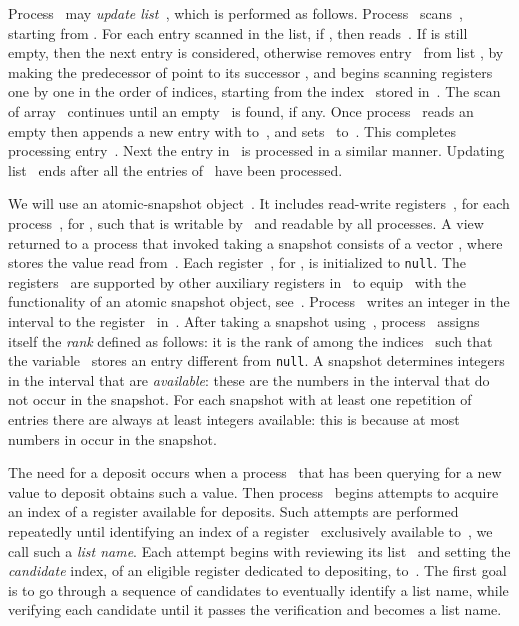 \documentclass[11pt]{article}
\begin{document}
Process~ may \emph{update list~}, which is performed as follows.
Process~ scans~, starting from .
For each entry  scanned in the list, if , then  reads~. 
If  is still empty, then the next entry  is considered, otherwise  removes entry~ from  list , by making the predecessor of  point to its successor , and begins scanning registers~ one by one in the order of indices, starting from the index~ stored in~.
The scan of array~ continues until an empty~ is found, if any.
Once process~ reads an empty  then  appends a new entry  with   to~, and sets~ to~.
This completes processing entry~.
Next the entry  in~ is processed in a similar manner.
Updating list~ ends after all the entries of~ have been processed.

We will use an atomic-snapshot object~. 
It includes read-write registers~, for each process~, for , such that  is writable by~ and readable by all processes.
A view returned to a process that invoked taking a snapshot consists of a vector , where  stores the value read from~.
Each register~, for , is initialized to \texttt{null}.
The registers~ are supported by other auxiliary registers in~ to equip~ with the functionality of an atomic snapshot object, see~\cite{AfekADGMS93}.
Process~ writes an integer in the interval  to the register~ in~.
After taking a snapshot using~, process~ assigns itself the \emph{rank} defined as follows: it is the rank of  among the indices~ such that the variable~ stores an entry different from \texttt{null}.
A snapshot determines integers in the interval  that are \emph{available}: these are the numbers in the interval that do not occur in the snapshot.
For each snapshot with at least one repetition of entries there are always at least  integers available: this is because at most  numbers in  occur in the snapshot.

The need for a deposit occurs when a process~ that has been querying for a new value to deposit obtains such a value.
Then process~ begins attempts to acquire an index of a register available for deposits.
Such attempts are performed repeatedly until identifying an index of a register~ exclusively available to~, we call such  a \emph{list name}.
Each attempt begins with  reviewing its list~ and setting the \emph{candidate} index, of an eligible register dedicated to depositing, to~.
The first goal is to go through a sequence of candidates to eventually identify a list name, while verifying each candidate until it passes the verification and becomes a list name.
\end{document}
